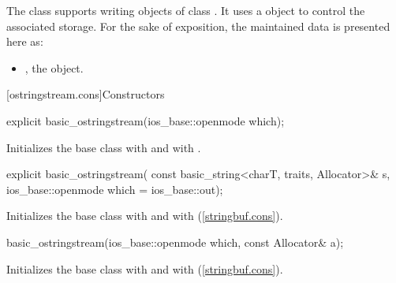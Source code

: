 \pnum
The class
supports writing objects of class
.
It uses a
object to control the associated storage.
For the sake of exposition, the maintained data is presented here as:
\begin{itemize}
\item
{}, the  object.
\end{itemize}

[ostringstream.cons]{Constructors}

%
\begin{itemdecl}
explicit basic_ostringstream(ios_base::openmode which);
\end{itemdecl}

\begin{itemdescr}
\pnum
\effects
Initializes the base class with
and  with
.
\end{itemdescr}

%
\begin{itemdecl}
explicit basic_ostringstream(
  const basic_string<charT, traits, Allocator>& s,
  ios_base::openmode which = ios_base::out);
\end{itemdecl}

\begin{itemdescr}
\pnum
\effects
Initializes the base class with
and  with
\linebreak(\ref{stringbuf.cons}). %
\end{itemdescr}

%
\begin{itemdecl}
basic_ostringstream(ios_base::openmode which, const Allocator& a);
\end{itemdecl}

\begin{itemdescr}
\pnum
\effects
Initializes the base class with
and  with
\linebreak(\ref{stringbuf.cons}). %
\end{itemdescr}

